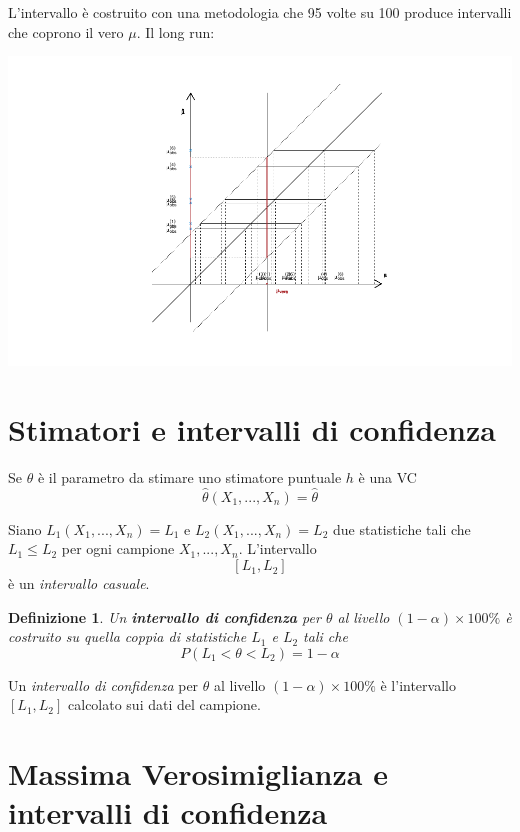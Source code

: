 \documentclass[
  11pt,
]{book}
\theoremstyle{mytheoremstyle}
\theoremstyle{mydefstyle}
\newtheorem{definition}{Definizione}[section]
\begin{document}
L'intervallo è costruito con una metodologia che 95 volte su 100 produce intervalli che coprono il vero \(\mu\).
Il long run:

\begin{center}\includegraphics{Appunti_di_Statistica_2025_files/figure-latex/13-stima-intervallare-12-1} \end{center}

\section{Stimatori e intervalli di confidenza}\label{stimatori-e-intervalli-di-confidenza}

Se \(\theta\) è il parametro da stimare uno stimatore puntuale \(h\) è una VC
\[\hat\theta(X_1,...,X_n)=\hat\theta\]

Siano \(L_1(X_1,...,X_n)=L_1\) e \(L_2(X_1,...,X_n)=L_2\) due statistiche tali che
\(L_1\leq L_2\) per ogni campione \(X_1,...,X_n\).
L'intervallo
\[[L_1,L_2]\]
è un \emph{intervallo casuale}.

\begin{info}

\begin{definition}
Un \textbf{intervallo di confidenza} per \(\theta\) al livello \((1-\alpha)\times 100\%\) è costruito su quella coppia di statistiche \(L_1\) e \(L_2\) tali che
\[P(L_1<\theta<L_2)=1-\alpha\]
\end{definition}

\end{info}

Un \emph{intervallo di confidenza} per \(\theta\) al livello \((1-\alpha)\times 100\%\) è l'intervallo \([L_1,L_2]\) calcolato sui dati del campione.

\section{Massima Verosimiglianza e intervalli di confidenza}\label{massima-verosimiglianza-e-intervalli-di-confidenza}
\end{document}
